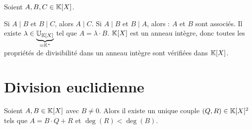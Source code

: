 \documentclass[12pt, a4paper]{report}
\begin{document}
\begin{property}
    Soient $A,B,C \in \mathbb{K}[X]$.
    \begin{outline}[enumerate]
        \1 Si $A \mid B$ et $B \mid C$, alors $A \mid C$.
        \1 Si $A \mid B$ et $B \mid A$, alors :
        \2 $A$ et $B$ sont associés.
        \2 Il existe $\lambda \in \underbrace{\mathbb{U}_{\mathbb{K}[X]}}_{=\mathbb{K}^*}$ tel que $A = \lambda \cdot B$.
        \1 $\mathbb{K}[X]$ est un anneau intègre, donc toutes les propriétés de divisibilité dans un anneau intègre sont vérifiées dans $\mathbb{K}[X]$.
    \end{outline}
\end{property}

\section{Division euclidienne}

\begin{theorem}
    Soient $A,B \in \mathbb{K}[X]$ avec $B \ne 0$. 
    Alors il existe un unique couple $(Q,R) \in \mathbb{K}[X]^2$ tels que $A = B\cdot Q + R$ et $\deg(R) < \deg(B)$.
\end{theorem}
\end{document}

